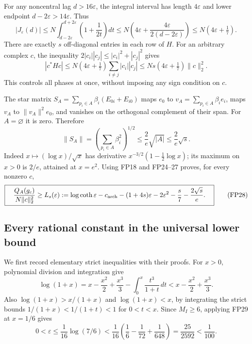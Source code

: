 \documentclass[11pt,a4paper]{article}
\theoremstyle{definition}\newtheorem{definition}[theorem]{Definition}
\begin{document}
For any noncentral lag \(d>16\varepsilon\), the integral interval has
length \(4\varepsilon\) and lower endpoint \(d-2\varepsilon>14\varepsilon\). Thus
\[
 |J_\varepsilon(d)|\le
 N\int_{d-2\varepsilon}^{d+2\varepsilon}\left(1+\frac1{2t}\right)dt
 \le N\left(4\varepsilon+\frac{4\varepsilon}{2(d-2\varepsilon)}\right)
 \le N(4\varepsilon+\tfrac17).
 \tag{FP25}\label{fp:fpb:J-bound}
\]
There are exactly \(s\) off-diagonal entries in each row of \(H\).
For an arbitrary complex \(c\), the inequality
\(2|c_i||c_j|\le|c_i|^2+|c_j|^2\) gives
\[
 |c^*Hc|\le
 N(4\varepsilon+\tfrac17)\sum_{i\ne j}|c_i||c_j|
 \le Ns(4\varepsilon+\tfrac17)\|c\|_2^2 .
 \tag{FP26}
\]
This controls all phases at once, without imposing any sign
condition on \(c\).

The star matrix
\(S_A=\sum_{p_i\in A}\beta_i(E_{0i}+E_{i0})\)
maps \(e_0\) to \(v_A=\sum_{p_i\in A}\beta_i e_i\), maps \(v_A\)
to \(\|v_A\|^2e_0\), and vanishes on the orthogonal complement
of their span. For \(A=\varnothing\) it is zero. Therefore
\[
 \|S_A\|=\left(\sum_{p_i\in A}\beta_i^2\right)^{1/2}
 \le \frac2e\sqrt{|A|}\le\frac2e\sqrt s .
 \tag{FP27}\label{fp:fpb:star}
\]
Indeed \(x\mapsto(\log x)/\sqrt x\) has derivative
\(x^{-3/2}(1-\tfrac12\log x)\); its maximum on \(x>0\) is
\(2/e\), attained at \(x=e^2\).
Using FP18 and FP24--27 proves, for every nonzero \(c\),
\[
 \boxed{\quad
 \frac{Q_A(g_c)}{N\|c\|_2^2}\ge
 L_s(\varepsilon):=
 \log\coth\varepsilon-c_{\rm arch}
 -(1+4s)\varepsilon-2\varepsilon^2-\frac s7-\frac{2\sqrt s}{e}.
 \quad}
 \tag{FP28}\label{fp:fpb:uniform}
\]

\subsection{Every rational constant in the universal lower bound}

We first record elementary strict inequalities with their proofs.
For \(x>0\), polynomial division and integration give
\[
 \log(1+x)
 =x-\frac{x^2}{2}+\frac{x^3}{3}
       -\int_0^x\frac{t^3}{1+t}\,dt
 <x-\frac{x^2}{2}+\frac{x^3}{3}.
 \tag{FP29}\label{fp:fpb:log-upper}
\]
Also
\(\log(1+x)>x/(1+x)\) and \(\log(1+x)<x\), by integrating
the strict bounds \(1/(1+x)<1/(1+t)<1\) for \(0<t<x\).
Since \(M_I\ge6\), applying FP29 at \(x=1/6\) gives
\[
 0<\varepsilon\le\frac1{16}\log(7/6)
 <\frac1{16}\left(\frac16-\frac1{72}+\frac1{648}\right)
 =\frac{25}{2592}<\frac1{100}.
 \tag{FP30}\label{fp:fpb:eps-bound}
\]
\end{document}
